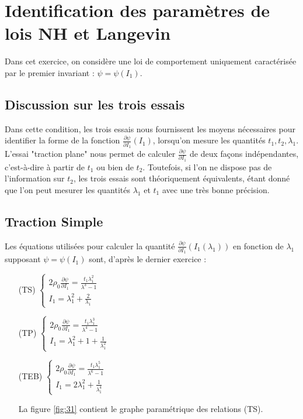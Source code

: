 \documentclass[a4paper,11pt]{article}
\begin{document}
\section{Identification des paramètres de lois NH et Langevin}

Dans cet exercice, on considère une loi de comportement uniquement caractérisée par le premier invariant : $\psi = \psi(I_1)$.

\subsection {Discussion sur les trois essais}

Dans cette condition, les trois essais nous fournissent les moyens nécessaires pour identifier la forme de la fonction $\frac{\partial\psi}{\partial I_1} (I_1)$, lorsqu'on mesure les quantités $t_1, t_2, \lambda_1$. L'essai "traction plane" nous permet de calculer $\frac{\partial\psi}{\partial I_1}$ de deux façons indépendantes, c'est-à-dire à partir de $t_1$ ou bien de $t_2$. Toutefois, si l'on ne dispose pas de l'information sur $t_2$, les trois essais sont théoriquement équivalents, étant donné que l'on peut mesurer les quantités $\lambda_1$ et $t_1$ avec une très bonne précision.

\subsection {Traction Simple}
Les équations utilisées pour calculer la quantité $\frac{\partial\psi}{\partial I_1} (I_1(\lambda_1))$ en fonction de $\lambda_1$ supposant $\psi = \psi(I_1)$ sont, d'après le dernier exercice :
\begin{enumerate}
\item[(TS)]
$
\begin{cases}
2 \rho_0 \frac{\partial\psi}{\partial I_1} = \frac{t_1\lambda_1^2}{\lambda^3-1}\\
I_1 = \lambda_1^2 + \frac{2}{\lambda_1}
\end{cases}
$
\item[(TP)]
$
\begin{cases}
2 \rho_0 \frac{\partial\psi}{\partial I_1} = \frac{t_1\lambda_1^3}{\lambda^4-1}\\
I_1 = \lambda_1^2 + 1 + \frac{1}{\lambda_1^2}
\end{cases}
$
\item[(TEB)]
$
\begin{cases}
2 \rho_0 \frac{\partial\psi}{\partial I_1} = \frac{t_1\lambda_1^5}{\lambda^6-1}\\
I_1 = 2\lambda_1^2 + \frac{1}{\lambda_1^4}
\end{cases}
$

La figure \ref{fig:31} contient le graphe paramétrique des relations (TS).

\end{enumerate}
\end{document}
